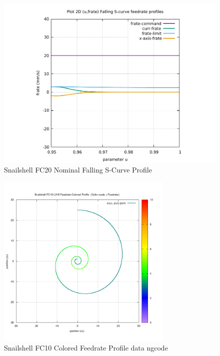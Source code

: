 \begin{figure}
	\caption     {Snailshell FC20 Nominal Falling S-Curve Profile}
	\label{16-img-Snailshell-FC20-Nominal-Falling-S-Curve-Profile.pdf}
	\includegraphics[width=1.00\textwidth]{Chap4/appendix/app-Snailshell/plots/16-img-Snailshell-FC20-Nominal-Falling-S-Curve-Profile.pdf}
\end{figure}

\clearpage
\pagebreak

\begin{figure}
	\caption     {Snailshell FC10 Colored Feedrate Profile data ngcode}
	\label{17-img-Snailshell-FC10-Colored-Feedrate-Profile-data_ngcode.png}
	\includegraphics[width=0.75\textwidth]{Chap4/appendix/app-Snailshell/plots/17-img-Snailshell-FC10-Colored-Feedrate-Profile-data_ngcode.png}
\end{figure}



